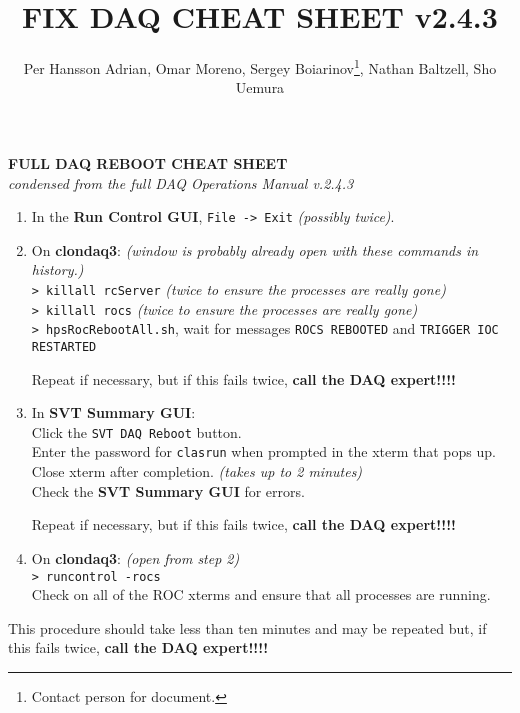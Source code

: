 \documentclass[12pt]{article}
\title{FIX DAQ CHEAT SHEET v2.4.3}
\author{Per Hansson Adrian, Omar Moreno, Sergey Boiarinov\thanks{Contact person for document.}, Nathan Baltzell, Sho Uemura }
\begin{document}
\begin{center}
\textbf{FULL DAQ REBOOT CHEAT SHEET} \\

\textit{condensed from the full DAQ Operations Manual v.2.4.3}
\end{center}

\begin{enumerate}

\item In the \textbf{Run Control GUI}, \texttt{File -> Exit} \textit{(possibly twice)}.
\item On \textbf{clondaq3}: \textit{(window is probably already open with these commands in history.)}\\

\hspace*{0.5cm}\texttt{> killall rcServer} \textit{(twice to ensure the processes are really gone)}\\
\hspace*{0.5cm}\texttt{> killall rocs} \textit{(twice to ensure the processes are really gone)}\\
\hspace*{0.5cm}\texttt{> hpsRocRebootAll.sh}, wait for messages \texttt{ROCS REBOOTED} and \texttt{TRIGGER IOC RESTARTED}

\hspace*{0.5cm}Repeat if necessary, but if this fails twice, \textbf{call the DAQ expert!!!!}

\item In \textbf{SVT Summary GUI}: \\

\hspace*{0.5cm}Click the \texttt{SVT DAQ Reboot} button.\\
\hspace*{0.5cm}Enter the password for \texttt{clasrun} when prompted in the xterm that pops up. \\
\hspace*{0.5cm}Close xterm after completion. \textit{(takes up to 2 minutes)}\\
\hspace*{0.5cm}Check the \textbf{SVT Summary GUI} for errors.

\hspace*{0.5cm}Repeat if necessary, but if this fails twice, \textbf{call the DAQ expert!!!!}

\item On \textbf{clondaq3}: \textit{(open from step 2)} \\

\hspace*{0.5cm}\texttt{> runcontrol -rocs} \\
\hspace*{0.5cm}Check on all of the ROC xterms and ensure that all processes are running.
\end{enumerate}

This procedure should take less than ten minutes and may be repeated but, if this fails twice, \textbf{call the DAQ expert!!!!}
\end{document}
